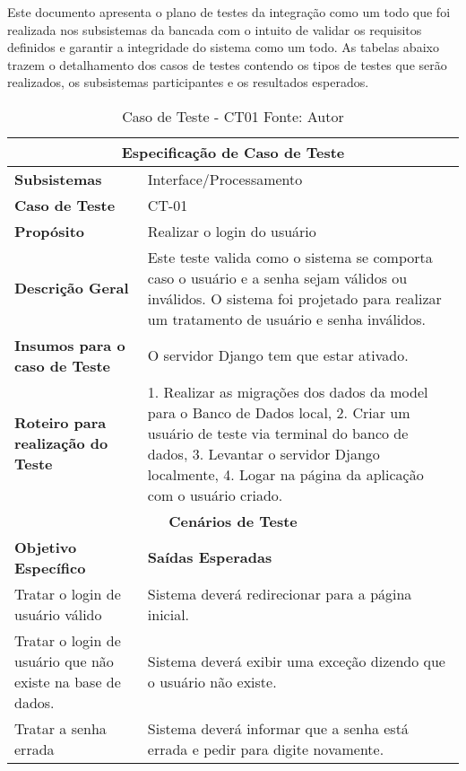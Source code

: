 Este documento apresenta o plano de testes da integração como um todo que foi realizada nos subsistemas da bancada com o intuito de validar os requisitos
definidos e garantir a integridade do sistema como um todo. As tabelas abaixo trazem o detalhamento dos casos de testes contendo os tipos de testes que serão
realizados, os subsistemas participantes e os resultados esperados.
\vfill
\begin{table}[]
    \begin{center}
        \begin{longtable}{|p{5cm}|p{12cm}|}
            \hline
            \multicolumn{2}{|c|}{\textbf{Especificação de Caso de Teste}} \\ \hline
                \textbf{Subsistemas}                               & Interface/Processamento \\ \hline
                \textbf{Caso de Teste}                             & CT-01 \\ \hline
                \textbf{Propósito}                                     & Realizar o login do usuário \\ \hline
                \textbf{Descrição Geral}                           & Este teste valida como o sistema se comporta caso o usuário e a senha sejam válidos ou inválidos. O sistema foi projetado para realizar um tratamento de usuário e senha inválidos. \\ \hline
                \textbf{Insumos para o caso de Teste}    & O servidor Django tem que estar ativado. \\ \hline
                \textbf{Roteiro para realização do Teste}&  1. Realizar as migrações dos dados da model para o Banco de Dados local, 2. Criar um usuário de teste via terminal do banco de dados, 3. Levantar o servidor Django localmente, 4. Logar na página da aplicação com o usuário criado. \\ \hline
            \multicolumn{2}{|c|}{\textbf{Cenários de Teste}} \\ \hline
                \textbf{Objetivo Específico}                      & \textbf{Saídas Esperadas} \\ \hline
		  Tratar o login de usuário válido                           & Sistema deverá redirecionar para a página inicial.                                                                                                                                                                                    \\ \hline
		  Tratar o login de usuário que não existe na base de dados. & Sistema deverá exibir uma exceção dizendo que o usuário não existe.                                                                                                                                                                   \\ \hline
		  Tratar a senha errada                                      & Sistema deverá informar que a senha está errada e pedir para digite novamente.
        \end{longtable}
    \end{center}
    \caption[Caso de Teste - CT01]{Caso de Teste - CT01
    \protect Fonte: Autor}
    \label{CT-01}
\end{table}

